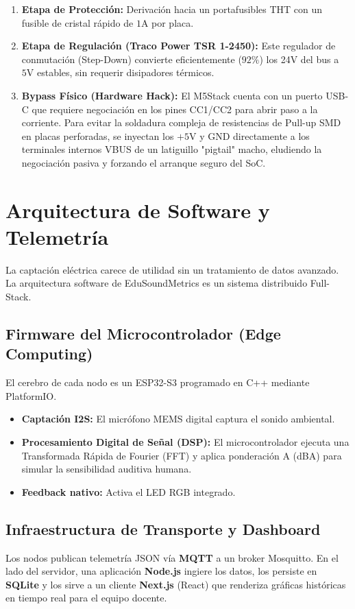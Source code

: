 \documentclass[11pt,a4paper]{article}
\begin{document}
\begin{enumerate}
    \item \textbf{Etapa de Protección:} Derivación hacia un portafusibles THT con un fusible de cristal rápido de $1\text{A}$ por placa.
    \item \textbf{Etapa de Regulación (Traco Power TSR 1-2450):} Este regulador de conmutación (Step-Down) convierte eficientemente ($92\%$) los 24V del bus a $5\text{V}$ estables, sin requerir disipadores térmicos.
    \item \textbf{Bypass Físico (Hardware Hack):} El M5Stack cuenta con un puerto USB-C que requiere negociación en los pines CC1/CC2 para abrir paso a la corriente. Para evitar la soldadura compleja de resistencias de Pull-up SMD en placas perforadas, se inyectan los $+5\text{V}$ y GND directamente a los terminales internos VBUS de un latiguillo "pigtail" macho, eludiendo la negociación pasiva y forzando el arranque seguro del SoC.
\end{enumerate}

\section{Arquitectura de Software y Telemetría}

La captación eléctrica carece de utilidad sin un tratamiento de datos avanzado. La arquitectura software de EduSoundMetrics es un sistema distribuido Full-Stack.

\subsection{Firmware del Microcontrolador (Edge Computing)}
El cerebro de cada nodo es un ESP32-S3 programado en C++ mediante PlatformIO.
\begin{itemize}
    \item \textbf{Captación I2S:} El micrófono MEMS digital captura el sonido ambiental.
    \item \textbf{Procesamiento Digital de Señal (DSP):} El microcontrolador ejecuta una Transformada Rápida de Fourier (FFT) y aplica ponderación A (dBA) para simular la sensibilidad auditiva humana.
    \item \textbf{Feedback nativo:} Activa el LED RGB integrado.
\end{itemize}

\subsection{Infraestructura de Transporte y Dashboard}
Los nodos publican telemetría JSON vía \textbf{MQTT} a un broker Mosquitto. En el lado del servidor, una aplicación \textbf{Node.js} ingiere los datos, los persiste en \textbf{SQLite} y los sirve a un cliente \textbf{Next.js} (React) que renderiza gráficas históricas en tiempo real para el equipo docente.
\end{document}
